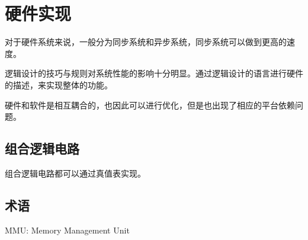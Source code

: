 \documentclass[cn,11pt,chinese,black,simple]{../elegantbook}
\begin{document}
\fi 
\def\chapname{06hw}

\chapter{硬件实现}

对于硬件系统来说，一般分为同步系统和异步系统，同步系统可以做到更高的速度。


逻辑设计的技巧与规则对系统性能的影响十分明显。通过逻辑设计的语言进行硬件的描述，来实现整体的功能。


硬件和软件是相互耦合的，也因此可以进行优化，但是也出现了相应的平台依赖问题。


\section{组合逻辑电路}

组合逻辑电路都可以通过真值表实现。


\section*{术语}

MMU: Memory Management Unit




\let\chapname\undefined
\ifx\mainclass\undefined
\end{document}
